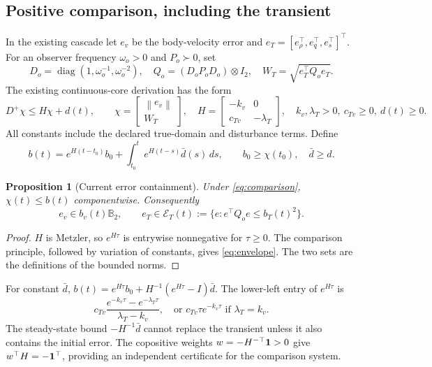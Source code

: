 \documentclass[10pt,letterpaper]{article}
\newtheorem{proposition}{Proposition}
\newcommand{\B}{\mathbb B}
\newcommand{\E}{\mathcal E}
\newcommand{\norm}[1]{\left\lVert#1\right\rVert}
\newcommand{\diag}{\operatorname{diag}}
\begin{document}
\subsection{Positive comparison, including the transient}
In the existing cascade let $e_v$ be the body-velocity error and
$e_T=[e_\rho^\top,e_q^\top,e_s^\top]^\top$. For an observer frequency $\omega_o>0$
and $P_o\succ0$, set
\begin{equation}
D_o=\diag(1,\omega_o^{-1},\omega_o^{-2}),\quad
Q_o=(D_oP_oD_o)\otimes I_2,\quad W_T=\sqrt{e_T^\top Q_o e_T}.
\end{equation}
The existing continuous-core derivation has the form
\begin{equation}\label{eq:comparison}
D^+\chi\le H\chi+d(t),\qquad
\chi=\begin{bmatrix}\norm{e_v}\\ W_T\end{bmatrix},\quad
H=\begin{bmatrix}-k_v&0\\c_{Tv}&-\lambda_T\end{bmatrix},
\quad k_v,\lambda_T>0,\ c_{Tv}\ge0,\ d(t)\ge0.
\end{equation}
All constants include the declared true-domain and disturbance terms. Define
\begin{equation}\label{eq:envelope}
b(t)=e^{H(t-t_0)}b_0+
\int_{t_0}^{t}e^{H(t-s)}\bar d(s)\,ds,
\qquad b_0\ge\chi(t_0),\quad \bar d\ge d.
\end{equation}
\begin{proposition}[Current error containment]\label{prop:observer}
Under \eqref{eq:comparison}, $\chi(t)\le b(t)$ componentwise. Consequently
\begin{equation}\label{eq:observerSet}
e_v\in b_v(t)\B_2,\qquad e_T\in\E_T(t):=
\{e:e^\top Q_o e\le b_T(t)^2\}.
\end{equation}
\end{proposition}
\begin{proof}
$H$ is Metzler, so $e^{H\tau}$ is entrywise nonnegative for $\tau\ge0$.
The comparison principle, followed by variation of constants, gives
\eqref{eq:envelope}. The two sets are the definitions of the bounded norms.
\end{proof}
For constant $\bar d$, $b(t)=e^{H\tau}b_0+H^{-1}(e^{H\tau}-I)\bar d$.
The lower-left entry of $e^{H\tau}$ is
\begin{equation}
c_{Tv}\frac{e^{-k_v\tau}-e^{-\lambda_T\tau}}{\lambda_T-k_v},
\quad\text{or }c_{Tv}\tau e^{-k_v\tau}\text{ if }\lambda_T=k_v.
\end{equation}
The steady-state bound $-H^{-1}\bar d$ cannot replace the transient unless it
also contains the initial error. The copositive weights
$w=-H^{-\top}{\bf1}>0$ give $w^\top H=-{\bf1}^\top$, providing an independent
certificate for the comparison system.
\end{document}
